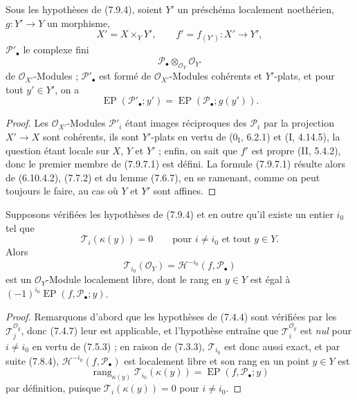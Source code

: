 \begin{proposition}[7.9.7]
\label{III.7.9.7.fr}
Sous les hypothèses de (7.9.4), soient $Y'$ un préschéma localement noethérien,
$g:Y'\to Y$ un morphisme,
\[
  X'=X\times_Y Y',
  \qquad f'=f_{(Y')}:X'\longrightarrow Y',
\]
$\mathscr P'_\bullet$ le complexe fini
\[
  \mathscr P_\bullet\otimes_{\mathscr O_Y}\mathscr O_{Y'}
\]
de $\mathscr O_{X'}$-Modules ; $\mathscr P'_\bullet$ est formé de
$\mathscr O_{X'}$-Modules cohérents et $Y'$-plats, et pour tout $y'\in Y'$, on a
\[
  \operatorname{EP}(\mathscr P'_\bullet;y')
  =\operatorname{EP}(\mathscr P_\bullet;g(y')).
  \tag{7.9.7.1}\label{III.7.9.7.1.fr}
\]
\end{proposition}

\begin{proof}
Les $\mathscr O_{X'}$-Modules $\mathscr P'_i$ étant images réciproques des
$\mathscr P_i$ par la projection $X'\to X$ sont cohérents, ils sont $Y'$-plats en
vertu de ($0_{\mathrm I}$, 6.2.1) et (I, 4.14.5), la question étant locale sur
$X$, $Y$ et $Y'$ ; enfin, on sait que $f'$ est propre (II, 5.4.2), donc le
premier membre de (7.9.7.1) est défini. La formule (7.9.7.1) résulte alors de
(6.10.4.2), (7.7.2) et du lemme (7.6.7), en se ramenant, comme on peut toujours
le faire, au cas où $Y$ et $Y'$ sont affines.
\end{proof}

\begin{proposition}[7.9.8]
\label{III.7.9.8.fr}
Supposons vérifiées les hypothèses de (7.9.4) et en outre qu'il existe un entier
$i_0$ tel que
\[
  \mathscr T_i(\kappa(y))=0
  \qquad\text{pour $i\ne i_0$ et tout $y\in Y$.}
\]
Alors
\[
  \mathscr T_{i_0}(\mathscr O_Y)
  =\mathscr H^{-i_0}(f,\mathscr P_\bullet)
\]
est un $\mathscr O_Y$-Module localement libre, dont le rang en $y\in Y$ est égal
à $(-1)^{i_0}\operatorname{EP}(f,\mathscr P_\bullet;y)$.
\end{proposition}

\begin{proof}
Remarquons d'abord que les hypothèses de (7.4.4) sont vérifiées par les
$\mathscr T_j^{\mathscr O_y}$, donc (7.4.7) leur est applicable, et l'hypothèse
entraîne que $\mathscr T_i^{\mathscr O_y}$ est \emph{nul} pour $i\ne i_0$ en
vertu de (7.5.3) ; en raison de (7.3.3), $\mathscr T_{i_0}$ est donc aussi exact,
et par suite (7.8.4), $\mathscr H^{-i_0}(f,\mathscr P_\bullet)$ est localement
libre et son rang en un point $y\in Y$ est
\[
  \operatorname{rang}_{\kappa(y)}
  \mathscr T_{i_0}(\kappa(y))
  =\operatorname{EP}(f,\mathscr P_\bullet;y)
\]
par définition, puisque $\mathscr T_i(\kappa(y))=0$ pour $i\ne i_0$.
\end{proof}

